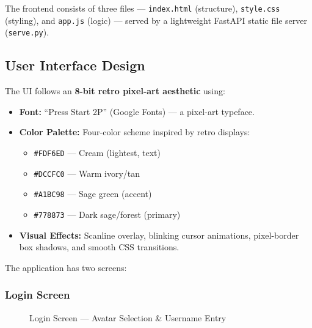 \documentclass[12pt, a4paper]{article}
\begin{document}
The frontend consists of three files — \texttt{index.html} (structure), \texttt{style.css} (styling), and \texttt{app.js} (logic) — served by a lightweight FastAPI static file server (\texttt{serve.py}).

\subsection{User Interface Design}

The UI follows an \textbf{8-bit retro pixel-art aesthetic} using:
\begin{itemize}[leftmargin=*]
    \item \textbf{Font:} ``Press Start 2P'' (Google Fonts) — a pixel-art typeface.
    \item \textbf{Color Palette:} Four-color scheme inspired by retro displays:
    \begin{itemize}
        \item \texttt{\#FDF6ED} — Cream (lightest, text)
        \item \texttt{\#DCCFC0} — Warm ivory/tan
        \item \texttt{\#A1BC98} — Sage green (accent)
        \item \texttt{\#778873} — Dark sage/forest (primary)
    \end{itemize}
    \item \textbf{Visual Effects:} Scanline overlay, blinking cursor animations, pixel-border box shadows, and smooth CSS transitions.
\end{itemize}

The application has two screens:

\subsubsection{Login Screen}

\begin{figure}[H]
    \centering
    \caption{Login Screen — Avatar Selection \& Username Entry}
    \label{fig:login}
\end{figure}
\end{document}
